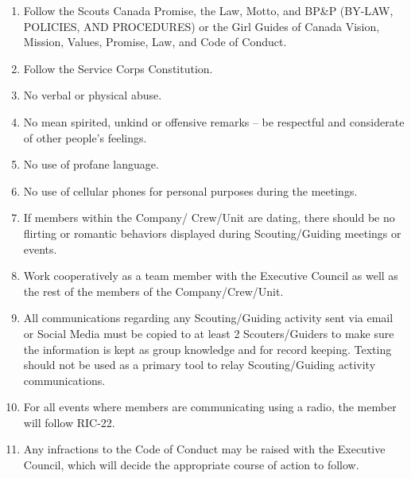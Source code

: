 \documentclass[letter, 11pt, oneside]{article}
\begin{document}
\begin{enumerate}
	\item Follow the Scouts Canada Promise, the Law, Motto, and BP\&P (BY-LAW, POLICIES, AND PROCEDURES) or the Girl Guides 	of Canada Vision, Mission, Values, Promise, Law, and Code of Conduct.
	\item Follow the Service Corps Constitution.
	\item No verbal or physical abuse.
	\item No mean spirited, unkind or offensive remarks – be respectful and considerate of other people’s feelings.
	\item No use of profane language.
	\item No use of cellular phones for personal purposes during the meetings.
	\item If members within the Company/ Crew/Unit are dating, there should be no flirting or romantic behaviors displayed during Scouting/Guiding meetings or events.
	\item Work cooperatively as a team member with the Executive Council as well as the rest of the members of the Company/Crew/Unit.
	\item All communications regarding any Scouting/Guiding activity sent via email or Social Media must be copied to at least 2 Scouters/Guiders to make sure the information is kept as group knowledge and for record keeping. Texting should not be used as a primary tool to relay Scouting/Guiding activity communications.
	\item For all events where members are communicating using a radio, the member will follow RIC-22.
	\item Any infractions to the Code of Conduct may be raised with the Executive Council, which will decide the appropriate course of action to follow.
	      		
\end{enumerate}
\end{document}
